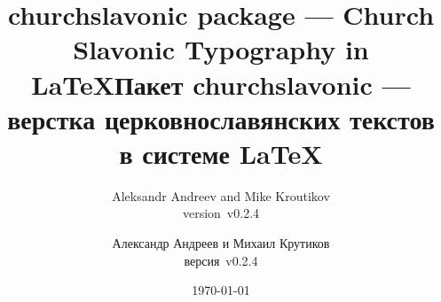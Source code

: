 \usepackage{fontspec,metalogo}

\newfontfamily{}
\newfontfamily{}
\setmonofont[Scale=MatchLowercase]{Fira Slav}
\newfontfamily{}
\newfontfamily{}
\newfontfamily{}
\newfontfamily{}
\newfontfamily{}

\usepackage{churchslavonic}
\usepackage{doc}
\usepackage{lettrine}
\usepackage[unicode,
  pdftitle={churchslavonic: a package for typesetting Church Slavonic documents in TeX},
  pdfauthor={Aleksandr Andreev and Mike Kroutikov},
  pdfkeywords={Church Slavonic, Old Church Slavonic, Church Slavic, Znamenny Notation, LaTeX, TeX, XeTeX, LuaTeX, OpenType, Unicode, церковнославянский, старославянский, знаменная нотация, крюки, столповая нотация}
]{hyperref}

\def\fileversion{v0.2.4}
\def\filedate{June 22, 2023}
\let\cuKrukFont=\musicFont
\def\pkg#1{\textsf{#1}}
\def\cs#1{\texttt{\textbackslash #1}}
%
%
\makeatletter
\def\cu@lettrine{\lettrine[lines=3,findent=0pt,nindent=0pt]}
\def\cuLettrine{\cu@tokenizeletter\cu@lettrine}
\renewcommand{\LettrineFontHook}{\cuKinovarColor}
\makeatother



\begin{EN}
\title{\pkg{churchslavonic} package --- Church Slavonic Typography in \LaTeX}
\author{Aleksandr Andreev and Mike Kroutikov\\version~\fileversion}
\end{EN}

\begin{RU}
\title{Пакет \pkg{churchslavonic} --- верстка церковнославянских текстов в системе \LaTeX}
\author{Александр Андреев и Михаил Крутиков\\версия~\fileversion}
\end{RU}

\date{\today}
\maketitle

